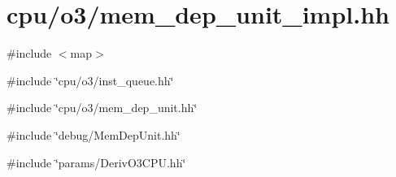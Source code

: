 \hypertarget{mem__dep__unit__impl_8hh}{
\section{cpu/o3/mem\_\-dep\_\-unit\_\-impl.hh}
\label{mem__dep__unit__impl_8hh}
}
{\ttfamily \#include $<$map$>$}\par
{\ttfamily \#include \char`\"{}cpu/o3/inst\_\-queue.hh\char`\"{}}\par
{\ttfamily \#include \char`\"{}cpu/o3/mem\_\-dep\_\-unit.hh\char`\"{}}\par
{\ttfamily \#include \char`\"{}debug/MemDepUnit.hh\char`\"{}}\par
{\ttfamily \#include \char`\"{}params/DerivO3CPU.hh\char`\"{}}\par
